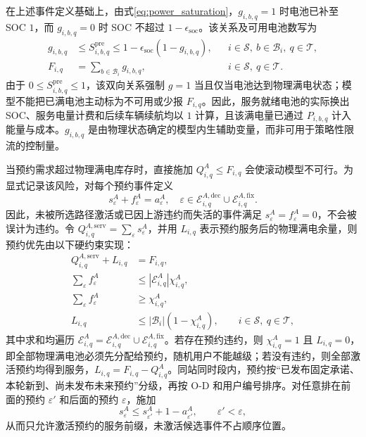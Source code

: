 \documentclass[12pt,a4paper,UTF8]{ctexart}
\begin{document}
在上述事件定义基础上，由式\eqref{eq:power_saturation}，$g_{i,b,q}=1$ 时电池已补至 SOC $1$，而 $g_{i,b,q}=0$ 时 SOC 不超过 $1-\epsilon_{\mathrm{soc}}$。该关系及可用电池数写为
\begin{subequations}
\label{eq:full_battery_count}
\begin{align}
g_{i,b,q}
&\le S_{i,b,q}^{\mathrm{pre}}
\le 1-\epsilon_{\mathrm{soc}}(1-g_{i,b,q}),
&&i\in\mathcal S,\ b\in\mathcal B_i,\ q\in\mathcal T,\label{eq:service_ready_relation}\\
F_{i,q}
&=\sum_{b\in\mathcal B_i}g_{i,b,q},
&&i\in\mathcal S,\ q\in\mathcal T.
\label{eq:available_battery_count}
\end{align}
\end{subequations}
由于 $0\le S_{i,b,q}^{\mathrm{pre}}\le1$，该双向关系强制 $g=1$ 当且仅当电池达到物理满电状态；模型不能把已满电池主动标为不可用或少报 $F_{i,q}$。因此，服务就绪电池的实际换出 SOC、服务电量计费和后续车辆续航均以 $1$ 计算，且该满电量已通过 $P_{i,b,q}$ 计入能量与成本。$g_{i,b,q}$ 是由物理状态确定的模型内生辅助变量，而非可用于策略性限流的控制量。

当预约需求超过物理满电库存时，直接施加 $Q_{i,q}^{A}\le F_{i,q}$ 会使滚动模型不可行。为显式记录该风险，对每个预约事件定义
\begin{equation}
s_\varepsilon^A+f_\varepsilon^A=a_\varepsilon^A,
\quad
\varepsilon\in
\mathcal E_{i,q}^{A,\mathrm{dec}}\cup
\mathcal E_{i,q}^{A,\mathrm{fix}}.
\label{eq:reservation_service_failure}
\end{equation}
因此，未被所选路径激活或已因上游违约而失活的事件满足 $s_\varepsilon^A=f_\varepsilon^A=0$，不会被误计为违约。令
$Q_{i,q}^{A,\mathrm{serv}}=\sum_\varepsilon s_\varepsilon^A$，并用 $L_{i,q}$ 表示预约服务后的物理满电余量，则预约优先由以下硬约束实现：
\begin{subequations}
\label{eq:reservation_priority}
\begin{align}
Q_{i,q}^{A,\mathrm{serv}}+L_{i,q}
&=F_{i,q},\\
\sum_\varepsilon f_\varepsilon^A
&\le |\mathcal E_{i,q}^{A}|\chi_{i,q}^A,\\
\sum_\varepsilon f_\varepsilon^A
&\ge \chi_{i,q}^A,\\
L_{i,q}
&\le |\mathcal B_i|(1-\chi_{i,q}^A),
\qquad i\in\mathcal S,\ q\in\mathcal T,
\end{align}
\end{subequations}
其中求和均遍历 $\mathcal E_{i,q}^{A}=\mathcal E_{i,q}^{A,\mathrm{dec}}\cup\mathcal E_{i,q}^{A,\mathrm{fix}}$。若存在预约违约，则 $\chi_{i,q}^A=1$ 且 $L_{i,q}=0$，即全部物理满电池必须先分配给预约，随机用户不能越级；若没有违约，则全部激活预约均得到服务，$L_{i,q}=F_{i,q}-Q_{i,q}^{A}$。同站同时段内，预约按“已发布固定承诺、本轮新到、尚未发布未来预约”分级，再按 O-D 和用户编号排序。对任意排在前面的预约 $\varepsilon'$ 和后面的预约 $\varepsilon$，施加
\begin{equation}
s_\varepsilon^A
\le s_{\varepsilon'}^A+1-a_{\varepsilon'}^A,
\qquad \varepsilon'<\varepsilon,
\label{eq:reservation_service_order}
\end{equation}
从而只允许激活预约的服务前缀，未激活候选事件不占顺序位置。
\end{document}
